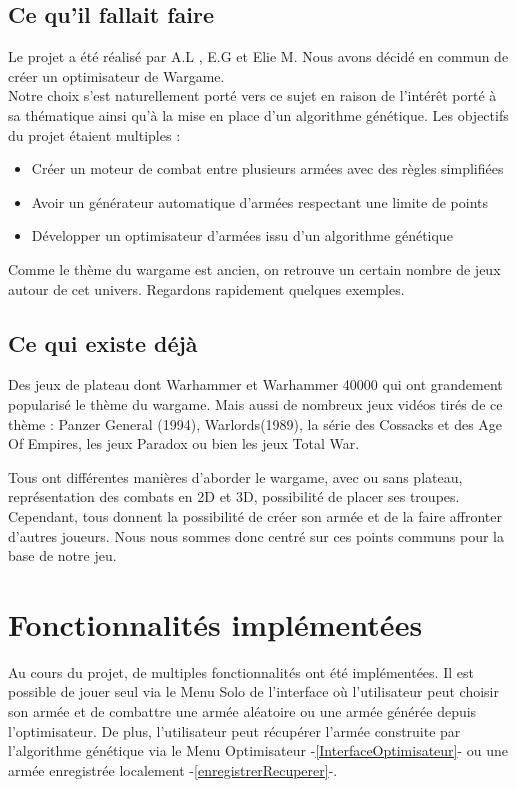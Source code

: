 \documentclass[a4paper]{article} %
\begin{document}
	\subsection{Ce qu’il fallait faire}
Le projet a été réalisé par A.L , E.G  et Elie M. Nous avons décidé en commun de créer un optimisateur de Wargame.
\\
Notre choix s'est naturellement porté vers ce sujet en raison de l'intérêt porté à sa thématique ainsi qu'à la mise en place d'un algorithme génétique.
Les objectifs du projet étaient multiples :
\begin{itemize}
        \item Créer un moteur de combat entre plusieurs armées avec des règles simplifiées
        \item Avoir un générateur automatique d'armées respectant une limite de points
        \item Développer un optimisateur d'armées issu d'un algorithme génétique
\end{itemize}
Comme le thème du wargame est ancien, on retrouve un certain nombre de jeux autour de cet univers. Regardons rapidement quelques exemples.

	\subsection{Ce qui existe déjà}
Des jeux de plateau dont Warhammer et Warhammer 40000 qui ont grandement popularisé le thème du wargame.
Mais aussi de nombreux jeux vidéos tirés de ce thème : Panzer General (1994), Warlords(1989), la série des Cossacks et des Age Of Empires, les jeux Paradox ou bien les jeux Total War.

Tous ont différentes manières d'aborder le wargame, avec ou sans plateau, représentation des combats en 2D et 3D, possibilité de placer ses troupes. Cependant, tous donnent la possibilité de créer son armée et de la faire affronter d'autres joueurs. Nous nous sommes donc centré sur ces points communs pour la base de notre jeu.

\section{Fonctionnalités implémentées}
Au cours du projet, de multiples fonctionnalités ont été implémentées. Il est possible de jouer seul via le Menu Solo de l'interface où l'utilisateur peut choisir son armée et de combattre une armée aléatoire ou une armée générée depuis l'optimisateur. De plus, l'utilisateur peut récupérer l'armée construite par l'algorithme génétique via le Menu Optimisateur -\ref{InterfaceOptimisateur}- ou une armée enregistrée localement -\ref{enregistrerRecuperer}-.\\
\end{document}
